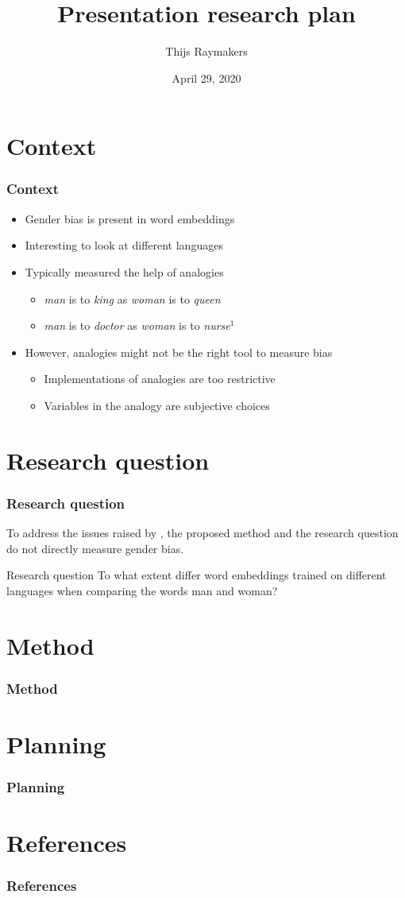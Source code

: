 \documentclass{beamer}
\author{Thijs Raymakers}
\title{Presentation research plan}
\date{April 29, 2020}
\begin{document}
\section{Context}
\begin{frame}
\frametitle{Context}
\begin{itemize}
    \item Gender bias is present in word embeddings~
    \pause
    \item Interesting to look at different languages
    \pause
    \item Typically measured the help of analogies
    \begin{itemize}
        \item \textit{man} is to \textit{king} as \textit{woman} is to \textit{queen}
        \item \textit{man} is to \textit{doctor} as \textit{woman} is to \textit{nurse}$^1$
    \end{itemize}
    \pause
    \item However, analogies might not be the right tool to measure bias 
    \begin{itemize}
        \item Implementations of analogies are too restrictive
        \item Variables in the analogy are subjective choices
    \end{itemize}
\end{itemize}
\end{frame}

\section{Research question}
\begin{frame}
\frametitle{Research question}
To address the issues raised by \textcite{2019arXiv190509866N}, the proposed method
and the research question do not directly measure gender bias.
\newline
\pause
\begin{block}{Research question}
To what extent differ word embeddings trained on different languages when comparing
the words man and woman?
\end{block}
\end{frame}

\section{Method}
\begin{frame}
\frametitle{Method}

\end{frame}

\section{Planning}
\begin{frame}
\frametitle{Planning}
\end{frame}

\section{References}
\begin{frame}[allowframebreaks]
\frametitle{References}
\printbibliography[heading=none]
\end{frame}
\end{document}
